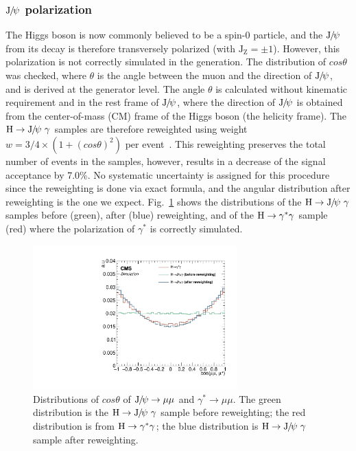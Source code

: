 		\subsubsection*{${\mathrm{J}\hspace{-.08em}/\hspace{-.14em}\psi}$ polarization}
		The Higgs boson is now commonly believed to be a spin-0 particle, and the ${\mathrm{J}\hspace{-.08em}/\hspace{-.14em}\psi}$ from its decay is therefore transversely polarized (with $\text{J}_{\text{Z}}=\pm 1$). However, this polarization is not correctly simulated in the generation. The distribution of $cos\theta$ was checked, where $\theta$ is the angle between the muon and the direction of ${\mathrm{J}\hspace{-.08em}/\hspace{-.14em}\psi}$, and is derived at the generator level. The angle $\theta$ is calculated without kinematic requirement and in the rest frame of ${\mathrm{J}\hspace{-.08em}/\hspace{-.14em}\psi}$, where the direction of ${\mathrm{J}\hspace{-.08em}/\hspace{-.14em}\psi}$ is obtained from the center-of-mass (CM) frame of the Higgs boson (the helicity frame). 
		The $\PH\to\JPsi\ \gamma$ samples are therefore reweighted using weight $w = 3/4\times(1+(cos\theta)^{2})$ per event~\cite{PhysRevD.83.031503}. This reweighting preserves the total number of events in the samples, however, results in a decrease of the signal acceptance by 7.0\%.
		No systematic uncertainty is assigned for this procedure since the reweighting is done via exact formula, and the angular distribution after reweighting is the one we expect. 
		Fig.~\ref{fig:JpsiPolarization} shows the distributions of the $\PH\to\JPsi\ \gamma$ samples before (green), after (blue) reweighting, and of the $\mathrm{H}\to\gamma^{*}\gamma$ sample (red) where the polarization of $\gamma^{*}$ is correctly simulated.
		
		\begin{figure}[!ht]\begin{center}
		  \includegraphics[width=0.7\textwidth]{Fig/GenLevel_HJpsiG/Jpsi_Polarization_H_new}
		  \caption{Distributions of $cos\theta$ of ${\mathrm{J}\hspace{-.08em}/\hspace{-.14em}\psi}\to\mu\mu$ and $\gamma^{*}\to\mu\mu$. The green distribution is the $\PH\to \JPsi\ \gamma$ sample before reweighting; the red distribution is from $\mathrm{H}\to \gamma^{*}\gamma$; the blue distribution is $\PH\to \JPsi\ \gamma$ sample after reweighting.}
		\label{fig:JpsiPolarization}\end{center}\end{figure} 
		
